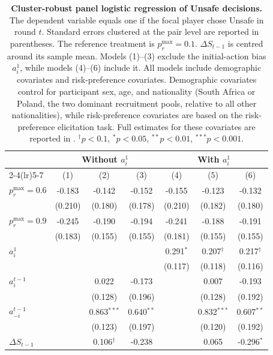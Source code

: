\documentclass[pdflatex,sn-mathphys-ay]{sn-jnl}
\theoremstyle{thmstyleone}
\theoremstyle{thmstyletwo}
\theoremstyle{thmstylethree}
\begin{document}
\begin{table}[t]
\centering
\small
\caption{\textbf{Cluster-robust panel logistic regression of Unsafe decisions.} 
The dependent variable equals one if the focal player chose Unsafe in round \(t\). 
Standard errors clustered at the pair level are reported in parentheses. 
The reference treatment is \(p_r^{\max}=0.1\). 
\(\Delta S_{t-1}\) is centred around its sample mean. 
Models (1)--(3) exclude the initial-action bias \(a_i^1\), while models (4)--(6) include it. 
All models include demographic covariates and risk-preference covariates.
Demographic covariates control for participant sex, age, and nationality (South Africa or Poland, the two dominant recruitment pools, relative to all other nationalities), while risk-preference covariates are based on the \cite{eckel2008forecastingRiskAttitudes} risk-preference elicitation task.
Full estimates for these covariates are reported in .
\(^{\dagger}p<0.1\), \(^{*}p<0.05\), \(^{**}p<0.01\), \(^{***}p<0.001\).}
\label{tab:cluster_logit_unsafe}
\begin{tabular}{lcccccc}
\toprule
 & \multicolumn{3}{c}{Without \(a_i^1\)}  & \multicolumn{3}{c}{With \(a_i^1\)} \\
\cmidrule(lr){2-4}\cmidrule(lr){5-7}
 & (1) & (2) & (3) & (4) & (5) & (6) \\
\midrule
\(p_r^{\max}=0.6\) & -0.183 & -0.142 & -0.152 & -0.155 & -0.123 & -0.132 \\
 & (0.210) & (0.180) & (0.178) & (0.210) & (0.182) & (0.180) \\
\(p_r^{\max}=0.9\) & -0.245 & -0.190 & -0.194 & -0.241 & -0.188 & -0.191 \\
 & (0.183) & (0.155) & (0.155) & (0.181) & (0.155) & (0.155) \\
\(a_i^1\) &  &  &  & 0.291\(^{*}\) & 0.207\(^{\dagger}\) & 0.217\(^{\dagger}\) \\
 &  &  &  & (0.117) & (0.118) & (0.116) \\
\(a_i^{t-1}\) &  & 0.022 & -0.173 &  & 0.007 & -0.193 \\
 &  & (0.128) & (0.196) &  & (0.128) & (0.192) \\
\(a_{-i}^{t-1}\) &  & 0.863\(^{***}\) & 0.640\(^{**}\) &  & 0.832\(^{***}\) & 0.607\(^{**}\) \\
 &  & (0.123) & (0.197) &  & (0.120) & (0.192) \\
\(\Delta S_{t-1}\) &  & 0.106\(^{\dagger}\) & -0.238 &  & 0.065 & -0.296\(^{*}\) \\

\end{tabular}
\end{table}
\end{document}
